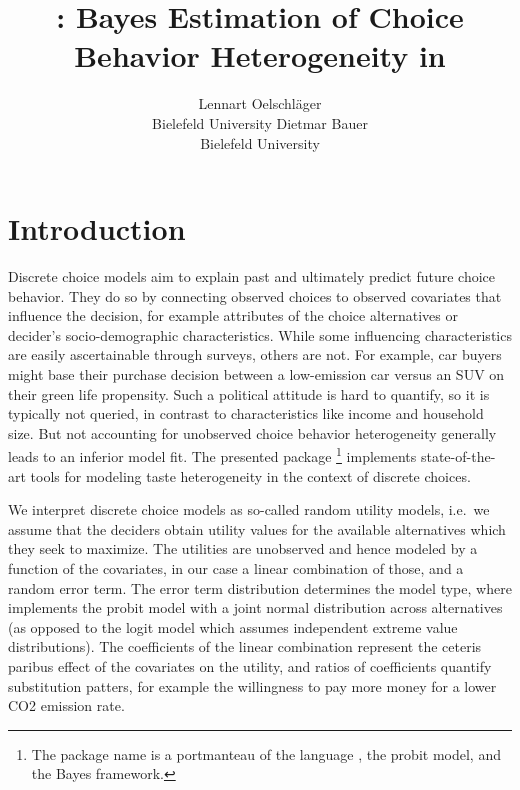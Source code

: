 \documentclass[article,shortnames]{jss}
\author{Lennart Oelschl\"ager \\Bielefeld University \And Dietmar Bauer\\Bielefeld University}
\title{\pkg{RprobitB}: Bayes Estimation of Choice Behavior Heterogeneity in \proglang{R}}
\newcommand{\fct}[1]{\code{#1()}}
\begin{document}





\section{Introduction}
\label{sec:introduction}

Discrete choice models aim to explain past and ultimately predict future choice behavior. They do so by connecting observed choices to observed covariates that influence the decision, for example attributes of the choice alternatives or decider's socio-demographic characteristics. While some influencing characteristics are easily ascertainable through surveys, others are not. For example, car buyers might base their purchase decision between a low-emission car versus an SUV on their green life propensity. Such a political attitude is hard to quantify, so it is typically not queried, in contrast to characteristics like income and household size. But not accounting for unobserved choice behavior heterogeneity generally leads to an inferior model fit. The presented  package \footnote{The package name is a portmanteau of the language , the probit model, and the Bayes framework.} \citep{Oelschlaeger:2021} implements state-of-the-art tools for modeling taste heterogeneity in the context of discrete choices.

We interpret discrete choice models as so-called random utility models, i.e.\ we assume that the deciders obtain utility values for the available alternatives which they seek to maximize. The utilities are unobserved and hence modeled by a function of the covariates, in our case a linear combination of those, and a random error term. The error term distribution determines the model type, where  implements the probit model with a joint normal distribution across alternatives (as opposed to the logit model which assumes independent extreme value distributions). The coefficients of the linear combination represent the ceteris paribus effect of the covariates on the utility, and ratios of coefficients quantify substitution patters, for example the willingness to pay more money for a lower CO2 emission rate.
\end{document}
